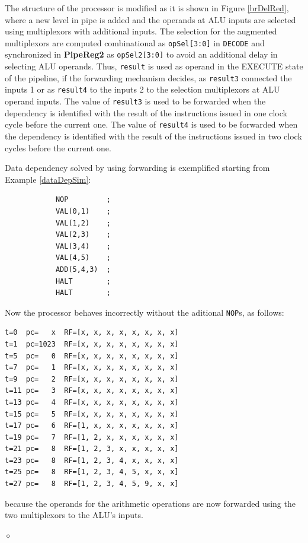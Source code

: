 The structure of the processor is modified as it is shown in Figure \ref{brDelRed}, where a new level in pipe is added and the operands at  ALU inputs are selected using multiplexors with additional inputs. The selection for the augmented multiplexors are computed combinational as {\tt opSel[3:0]} in {\tt DECODE} and synchronized in {\bf PipeReg2} as {\tt opSel2[3:0]} to avoid an additional delay in selecting ALU operands. Thus, {\tt result} is used as operand in the EXECUTE state of the pipeline, if the forwarding mechanism decides, as {\tt result3} connected the  inputs 1  or as {\tt result4} to the inputs 2 to the selection multiplexors at ALU operand inputs. The value of {\tt result3} is used to be forwarded when the dependency is identified with the result of the instructions issued in one clock cycle before the current one. The value of {\tt result4} is used to be forwarded when the dependency is identified with the result of the instructions issued in two clock cycles before the current one.

\begin{exemplu}\label{dataDepSim}
Data dependency  solved by using forwarding is exemplified starting from Example \ref{dataDepSim}:
\begin{verbatim}
            NOP         ;
            VAL(0,1)    ;
            VAL(1,2)    ;
            VAL(2,3)    ;
            VAL(3,4)    ;
            VAL(4,5)    ;
            ADD(5,4,3)  ;
            HALT        ;
            HALT        ;
\end{verbatim}
Now the processor behaves incorrectly without the aditional {\tt NOP}s, as follows:
\begin{verbatim}
t=0  pc=   x  RF=[x, x, x, x, x, x, x, x]
t=1  pc=1023  RF=[x, x, x, x, x, x, x, x]
t=5  pc=   0  RF=[x, x, x, x, x, x, x, x]
t=7  pc=   1  RF=[x, x, x, x, x, x, x, x]
t=9  pc=   2  RF=[x, x, x, x, x, x, x, x]
t=11 pc=   3  RF=[x, x, x, x, x, x, x, x]
t=13 pc=   4  RF=[x, x, x, x, x, x, x, x]
t=15 pc=   5  RF=[x, x, x, x, x, x, x, x]
t=17 pc=   6  RF=[1, x, x, x, x, x, x, x]
t=19 pc=   7  RF=[1, 2, x, x, x, x, x, x]
t=21 pc=   8  RF=[1, 2, 3, x, x, x, x, x]
t=23 pc=   8  RF=[1, 2, 3, 4, x, x, x, x]
t=25 pc=   8  RF=[1, 2, 3, 4, 5, x, x, x]
t=27 pc=   8  RF=[1, 2, 3, 4, 5, 9, x, x]
\end{verbatim}
because the operands for the arithmetic operations are now forwarded  using the two multiplexors to the ALU's inputs.

$\diamond$
\end{exemplu}


